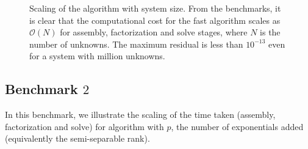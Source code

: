 \documentclass[times]{nlaauth}
\begin{document}
\begin{figure}[!htbp]
{}
\caption{Scaling of the algorithm with system size. From the benchmarks, it is clear that the computational cost for the fast algorithm scales as $\mathcal{O}(N)$ for assembly, factorization and solve stages, where $N$ is the number of unknowns. The maximum residual is less than $10^{-13}$ even for a system with million unknowns.}
\label{figure_benchmark1}
\end{figure}

\subsection{Benchmark $2$}
In this benchmark, we illustrate the scaling of the time taken (assembly, factorization and solve) for algorithm with $p$, the number of exponentials added (equivalently the semi-separable rank).
\end{document}
